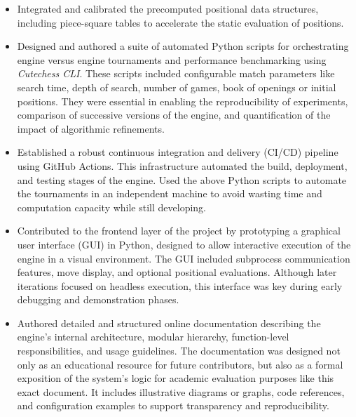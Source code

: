 \begin{itemize}[itemsep=1pt]
    \item Integrated and calibrated the precomputed positional data structures, including piece-square tables to accelerate the static evaluation of positions.

    \item Designed and authored a suite of automated Python scripts for orchestrating engine versus engine tournaments and performance benchmarking using \textit{Cutechess CLI}. These scripts included configurable match parameters like search time, depth of search, number of games, book of openings or initial positions. They were essential in enabling the reproducibility of experiments, comparison of successive versions of the engine, and quantification of the impact of algorithmic refinements.

    \item Established a robust continuous integration and delivery (CI/CD) pipeline using GitHub Actions. This infrastructure automated the build, deployment, and testing stages of the engine. Used the above Python scripts to automate the tournaments in an independent machine to avoid wasting time and computation capacity while still developing.

    \item Contributed to the frontend layer of the project by prototyping a graphical user interface (GUI) in Python, designed to allow interactive execution of the engine in a visual environment. The GUI included subprocess communication features, move display, and optional positional evaluations. Although later iterations focused on headless execution, this interface was key during early debugging and demonstration phases.

    \item Authored detailed and structured online documentation describing the engine's internal architecture, modular hierarchy, function-level responsibilities, and usage guidelines. The documentation was designed not only as an educational resource for future contributors, but also as a formal exposition of the system's logic for academic evaluation purposes like this exact document. It includes illustrative diagrams or graphs, code references, and configuration examples to support transparency and reproducibility.
\end{itemize}
